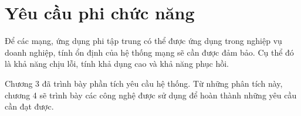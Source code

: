 \documentclass[../DoAn.tex]{subfiles}
\begin{document}
\section{Yêu cầu phi chức năng}
\label{section:2.4}
Để các mạng, ứng dụng phi tập trung có thể được ứng dụng trong nghiệp vụ doanh nghiệp, tính ổn định của hệ thống mạng sẽ cần được đảm bảo. Cụ thể đó là khả năng chịu lỗi, tính khả dụng cao và khả năng phục hồi.

Chương 3 đã trình bày phần tích yêu cầu hệ thống. Từ những phân tích này, chương 4 sẽ trình bày các công nghệ được sử dụng để hoàn thành những yêu cầu cần đạt được.
\end{document}
